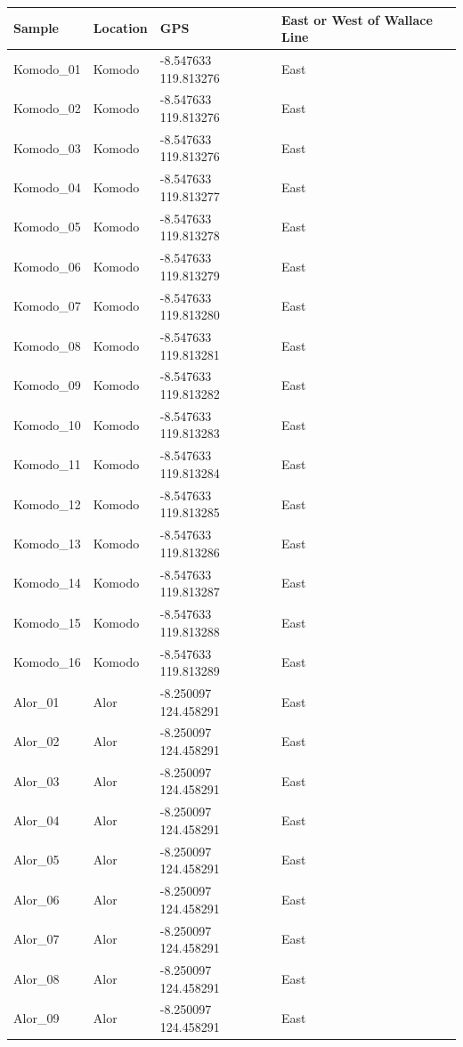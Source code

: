 \documentclass[
]{article}
\begin{document}
\begin{table}
\centering
\begin{tabular}{l|l|l|l}
\hline
Sample & Location & GPS & East or West of Wallace Line\\
\hline
Komodo\_01 & Komodo & -8.547633 119.813276 & East\\
\hline
Komodo\_02 & Komodo & -8.547633 119.813276 & East\\
\hline
Komodo\_03 & Komodo & -8.547633 119.813276 & East\\
\hline
Komodo\_04 & Komodo & -8.547633 119.813277 & East\\
\hline
Komodo\_05 & Komodo & -8.547633 119.813278 & East\\
\hline
Komodo\_06 & Komodo & -8.547633 119.813279 & East\\
\hline
Komodo\_07 & Komodo & -8.547633 119.813280 & East\\
\hline
Komodo\_08 & Komodo & -8.547633 119.813281 & East\\
\hline
Komodo\_09 & Komodo & -8.547633 119.813282 & East\\
\hline
Komodo\_10 & Komodo & -8.547633 119.813283 & East\\
\hline
Komodo\_11 & Komodo & -8.547633 119.813284 & East\\
\hline
Komodo\_12 & Komodo & -8.547633 119.813285 & East\\
\hline
Komodo\_13 & Komodo & -8.547633 119.813286 & East\\
\hline
Komodo\_14 & Komodo & -8.547633 119.813287 & East\\
\hline
Komodo\_15 & Komodo & -8.547633 119.813288 & East\\
\hline
Komodo\_16 & Komodo & -8.547633 119.813289 & East\\
\hline
Alor\_01 & Alor & -8.250097 124.458291 & East\\
\hline
Alor\_02 & Alor & -8.250097 124.458291 & East\\
\hline
Alor\_03 & Alor & -8.250097 124.458291 & East\\
\hline
Alor\_04 & Alor & -8.250097 124.458291 & East\\
\hline
Alor\_05 & Alor & -8.250097 124.458291 & East\\
\hline
Alor\_06 & Alor & -8.250097 124.458291 & East\\
\hline
Alor\_07 & Alor & -8.250097 124.458291 & East\\
\hline
Alor\_08 & Alor & -8.250097 124.458291 & East\\
\hline
Alor\_09 & Alor & -8.250097 124.458291 & East\\

\end{tabular}
\end{table}
\end{document}
